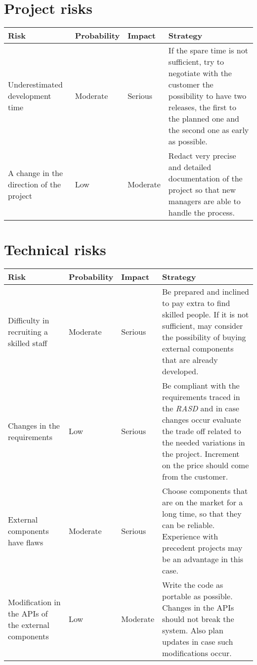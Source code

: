 \documentclass[11pt,a4paper]{report}
\begin{document}
\section{Project risks}
    \begin{tabularx}{\textwidth}{ |p{3cm}|p{1.8cm}|p{1.85cm}|X|}
    \hline
    Risk & Probability & Impact & Strategy \\
    \hline
    Underestimated development time & Moderate & Serious & If the spare time is not sufficient, try to negotiate with the customer the possibility to have two releases, the first to the planned one and the second one as early as possible. \\ \hline
    A change in the direction of the project & Low & Moderate & Redact very precise and detailed documentation of the project so that new managers are able to handle the process. \\ \hline
    \end{tabularx}
\section{Technical risks}
    \begin{tabularx}{\textwidth}{ |p{3cm}|p{1.8cm}|p{1.85cm}|X|}
    \hline
    Risk & Probability & Impact & Strategy \\ \hline
    Difficulty in recruiting a skilled staff & Moderate & Serious & Be prepared and inclined to pay extra to find skilled people. If it is not sufficient, may consider the possibility of buying external components that are already developed. \\ \hline
    Changes in the requirements & Low & Serious & Be compliant with the requirements traced in the \textit{RASD} and in case changes occur evaluate the trade off related to the needed variations in the project. Increment on the price should come from the customer. \\ \hline
    External components have flaws & Moderate & Serious & Choose components that are on the market for a long time, so that they can be reliable. Experience with precedent projects may be an advantage in this case. \\ \hline
    Modification in the APIs of the external components & Low & Moderate & Write the code as portable as possible. Changes in the APIs should not break the system. Also plan updates in case such modifications occur. \\ \hline
    \end{tabularx}
\end{document}
